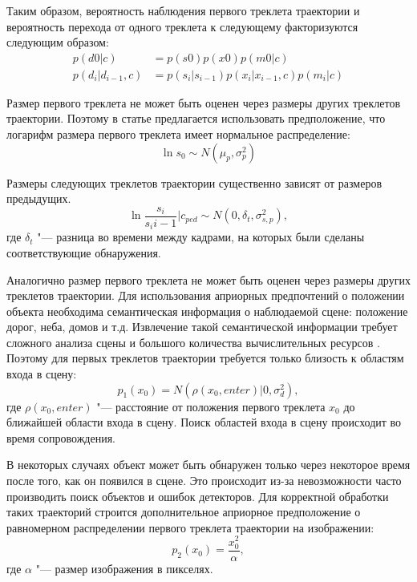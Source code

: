 Таким образом, вероятность наблюдения первого треклета траектории и вероятность перехода от одного треклета к следующему факторизуются следующим образом:
\begin{align}
	p(d 0 |c) &= p(s 0 )p(x 0 )p(m 0 |c) \\
	p(d_i|d_{i-1}, c) &= p(s_i | s_{i-1})p(x_i|x_{i-1}, c)p(m_i|c)
\end{align}

Размер первого треклета не может быть оценен через размеры других треклетов траектории. Поэтому в статье \cite{benfold2011stable} предлагается использовать предположение, что логарифм размера первого треклета имеет нормальное распределение:
\begin{equation}
	\ln s_0 \sim N(\mu_p, \sigma_p^2)
\end{equation}

Размеры следующих треклетов траектории существенно зависят от размеров предыдущих.
\begin{equation}
	\ln{\frac{s_i}{s_i{i-1}}}\bigg\rvert c_{ped} \sim N(0, \delta_t, \sigma_{s, p}^2),
\end{equation}
где $\delta_t$ "--- разница во времени между кадрами, на которых были сделаны соответствующие обнаружения.

Аналогично размер первого треклета не может быть оценен через размеры других треклетов траектории. Для использования априорных предпочтений о положении объекта необходима семантическая информация о наблюдаемой сцене: положение дорог, неба, домов и т.д. Извлечение такой семантической информации требует сложного анализа сцены и большого количества вычислительных ресурсов \cite{fulkerson2009class}. Поэтому для первых треклетов траектории требуется только близость к областям входа в сцену:
\begin{equation}
 	p_1(x_0) = N(\rho(x_0, enter)|0, \sigma_d^2),
 	\label{sec::tracking::eq::border_x}
\end{equation}
где $\rho(x_0, enter)$ "--- расстояние от положения первого треклета $x_0$ до ближайшей области входа в сцену. Поиск областей входа в сцену происходит во время сопровождения.

В некоторых случаях объект может быть обнаружен только через некоторое время после того, как он появился в сцене. Это происходит из-за невозможности часто производить поиск объектов и ошибок детекторов. Для корректной обработки таких траекторий строится дополнительное априорное предположение о равномерном распределении первого треклета траектории
на изображении:
\begin{equation}
	p_2(x_0)= \frac{x_0^2}{\alpha},
	\label{sec::tracking::eq::uniform_x}
\end{equation}
где $\alpha$ "--- размер изображения в пикселях.


